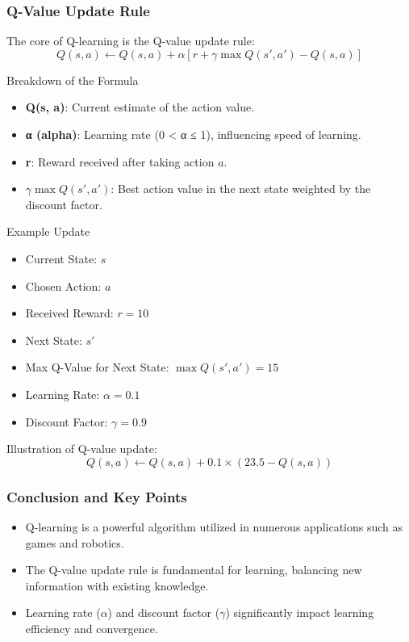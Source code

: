 \documentclass{beamer}
\begin{document}
\begin{frame}[fragile]
    \frametitle{Q-Value Update Rule}
    The core of Q-learning is the Q-value update rule:
    \[
    Q(s,a) \leftarrow Q(s,a) + \alpha \left[r + \gamma \max Q(s', a') - Q(s,a)\right]
    \]

    \begin{block}{Breakdown of the Formula}
        \begin{itemize}
            \item \textbf{Q(s, a)}: Current estimate of the action value.
            \item \textbf{α (alpha)}: Learning rate (0 < α ≤ 1), influencing speed of learning.
            \item \textbf{r}: Reward received after taking action \( a \).
            \item \textbf{$\gamma \max Q(s', a')$}: Best action value in the next state weighted by the discount factor.
        \end{itemize}
    \end{block}

    \begin{block}{Example Update}
        \begin{itemize}
            \item Current State: \( s \)
            \item Chosen Action: \( a \)
            \item Received Reward: \( r = 10 \)
            \item Next State: \( s' \)
            \item Max Q-Value for Next State: \( \max Q(s', a') = 15 \)
            \item Learning Rate: \( \alpha = 0.1 \)
            \item Discount Factor: \( \gamma = 0.9 \)
        \end{itemize}

        Illustration of Q-value update:
        \[
        Q(s, a) \leftarrow Q(s, a) + 0.1 \times (23.5 - Q(s, a))
        \]
    \end{block}
\end{frame}

\begin{frame}[fragile]
    \frametitle{Conclusion and Key Points}
    \begin{itemize}
        \item Q-learning is a powerful algorithm utilized in numerous applications such as games and robotics.
        \item The Q-value update rule is fundamental for learning, balancing new information with existing knowledge.
        \item Learning rate ($\alpha$) and discount factor ($\gamma$) significantly impact learning efficiency and convergence.
    \end{itemize}
\end{frame}
\end{document}
